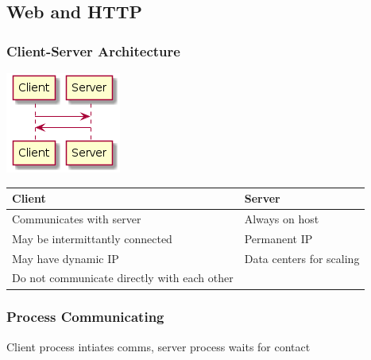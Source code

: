 \documentclass[11pt]{article}
\begin{document}
\subsection{Web and HTTP}
\label{sec:org86e80ba}
\subsubsection{Client-Server Architecture}
\label{sec:orgf36ffde}

\begin{center}
\includegraphics[width=.9\linewidth]{clientserver.png}
\end{center}

\begin{center}
\begin{tabular}{ll}
\textbf{Client} & \textbf{Server}\\
\hline
Communicates with server & Always on host\\
\hline
May be intermittantly connected & Permanent IP\\
\hline
May have dynamic IP & Data centers for scaling\\
\hline
Do not communicate directly with each other & \\
\end{tabular}
\end{center}

\subsubsection{Process Communicating}
\label{sec:orgc5c5efd}
Client process intiates comms, server process waits for contact
\end{document}
